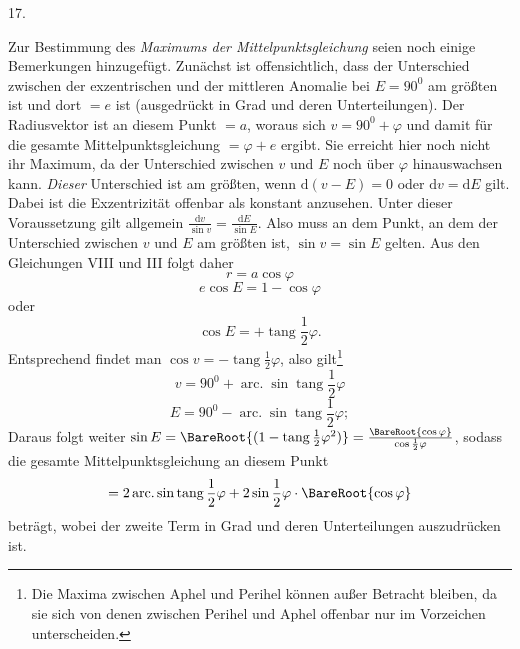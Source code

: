 \par{}
\begin{center}
\hypertarget{native-035-article017}{}17.
\end{center}
Zur Bestimmung des \emph{Maximums der Mittelpunktsgleichung} seien noch einige Bemerkungen hinzugefügt. Zunächst ist offensichtlich, dass der Unterschied zwischen der exzentrischen und der mittleren Anomalie bei $E=90^0$ am größten ist und dort $=e$ ist (ausgedrückt in Grad und deren Unterteilungen). Der Radiusvektor ist an diesem Punkt $=a$, woraus sich $v=90^0+\varphi$ und damit für die gesamte Mittelpunktsgleichung $=\varphi+e$ ergibt. Sie erreicht hier noch nicht ihr Maximum, da der Unterschied zwischen $v$ und $E$ noch über $\varphi$ hinauswachsen kann. \emph{Dieser} Unterschied ist am größten, wenn $\mathrm{d}(v-E)=0$ oder $\mathrm{d}v=\mathrm{d}E$ gilt. Dabei ist die Exzentrizität offenbar als konstant anzusehen. Unter dieser Voraussetzung gilt allgemein $\frac{\mathrm{d}v}{\sin v}=\frac{\mathrm{d}E}{\sin E}$. Also muss an dem Punkt, an dem der Unterschied zwischen $v$ und $E$ am größten ist, $\sin v=\sin E$ gelten. Aus den Gleichungen VIII und III folgt daher
\[
r=a\cos\varphi
\]
\[
e\cos E=1-\cos\varphi
\]
oder
\[
\cos E=+\operatorname{tang}\frac{1}{2}\varphi.
\]
Entsprechend findet man $\cos v=-\operatorname{tang}\frac{1}{2}\varphi$, also gilt\footnote{Die Maxima zwischen Aphel und Perihel können außer Betracht bleiben, da sie sich von denen zwischen Perihel und Aphel offenbar nur im Vorzeichen unterscheiden.}
\[
v=90^0+\operatorname{arc.}\sin\operatorname{tang}\frac{1}{2}\varphi
\]
\[
E=90^0-\operatorname{arc.}\sin\operatorname{tang}\frac{1}{2}\varphi;
\]
Daraus folgt weiter $\sin E=\BareRoot{(1-\operatorname{tang}\frac{1}{2}\varphi^2)}=\frac{\BareRoot{\cos\varphi}}{\cos\frac{1}{2}\varphi}$, sodass die gesamte Mittelpunktsgleichung an diesem Punkt
\[
=2\operatorname{arc.}\sin\operatorname{tang}\frac{1}{2}\varphi+2\sin\frac{1}{2}\varphi\cdot\BareRoot{\cos\varphi}
\]
beträgt, wobei der zweite Term in Grad und deren Unterteilungen auszudrücken ist.

